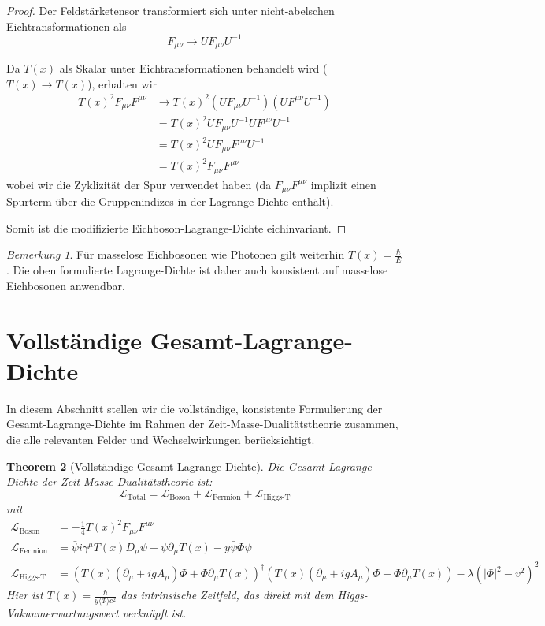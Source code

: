 \documentclass{article}
\newtheorem{theorem}{Theorem}[section]
\theoremstyle{definition}
\theoremstyle{remark}
\newtheorem{remark}[theorem]{Bemerkung}
\newcommand{\Tfield}{T(x)} %
\newcommand{\DcovT}[1]{\Tfield D_\mu #1 + #1 \partial_\mu \Tfield}
\newcommand{\DhiggsTdef}{\Tfield (\partial_\mu + igA_\mu)\Phi + \Phi \partial_\mu \Tfield}
\begin{document}
		\begin{proof}
			Der Feldstärketensor transformiert sich unter nicht-abelschen Eichtransformationen als
			\begin{equation}
				F_{\mu\nu} \rightarrow U F_{\mu\nu} U^{-1}
			\end{equation}
			
			Da $\Tfield$ als Skalar unter Eichtransformationen behandelt wird ($\Tfield \rightarrow \Tfield$), erhalten wir
			\begin{align}
				\Tfield^2 F_{\mu\nu}F^{\mu\nu} &\rightarrow \Tfield^2 (U F_{\mu\nu} U^{-1})(U F^{\mu\nu} U^{-1}) \\
				&= \Tfield^2 U F_{\mu\nu} U^{-1} U F^{\mu\nu} U^{-1} \\
				&= \Tfield^2 U F_{\mu\nu} F^{\mu\nu} U^{-1} \\
				&= \Tfield^2 F_{\mu\nu}F^{\mu\nu}
			\end{align}
			wobei wir die Zyklizität der Spur verwendet haben (da $F_{\mu\nu}F^{\mu\nu}$ implizit einen Spurterm über die Gruppenindizes in der Lagrange-Dichte enthält).
			
			Somit ist die modifizierte Eichboson-Lagrange-Dichte eichinvariant.
		\end{proof}
		
		\begin{remark}
			Für masselose Eichbosonen wie Photonen gilt weiterhin $\Tfield = \frac{\hbar}{E}$. Die oben formulierte Lagrange-Dichte ist daher auch konsistent auf masselose Eichbosonen anwendbar.
		\end{remark}
		
		\section{Vollständige Gesamt-Lagrange-Dichte}
		
		In diesem Abschnitt stellen wir die vollständige, konsistente Formulierung der Gesamt-Lagrange-Dichte im Rahmen der Zeit-Masse-Dualitätstheorie zusammen, die alle relevanten Felder und Wechselwirkungen berücksichtigt.
		
		\begin{theorem}[Vollständige Gesamt-Lagrange-Dichte]
			Die Gesamt-Lagrange-Dichte der Zeit-Masse-Dualitätstheorie ist:
			\begin{equation}
				\mathcal{L}_{\text{Total}} = \mathcal{L}_{\text{Boson}} + \mathcal{L}_{\text{Fermion}} + \mathcal{L}_{\text{Higgs-T}}
			\end{equation}
			mit
			\begin{align}
				\mathcal{L}_{\text{Boson}} &= -\frac{1}{4} \Tfield^2 F_{\mu\nu}F^{\mu\nu} \\
				\mathcal{L}_{\text{Fermion}} &= \bar{\psi}i\gamma^\mu \DcovT{\psi} - y\bar{\psi}\Phi\psi \\
				\mathcal{L}_{\text{Higgs-T}} &= (\DhiggsTdef)^\dagger (\DhiggsTdef) - \lambda(|\Phi|^2 - v^2)^2
			\end{align}
			Hier ist $\Tfield = \frac{\hbar}{y\langle\Phi\rangle c^2}$ das intrinsische Zeitfeld, das direkt mit dem Higgs-Vakuumerwartungswert verknüpft ist.
		\end{theorem}
		
\end{document}
